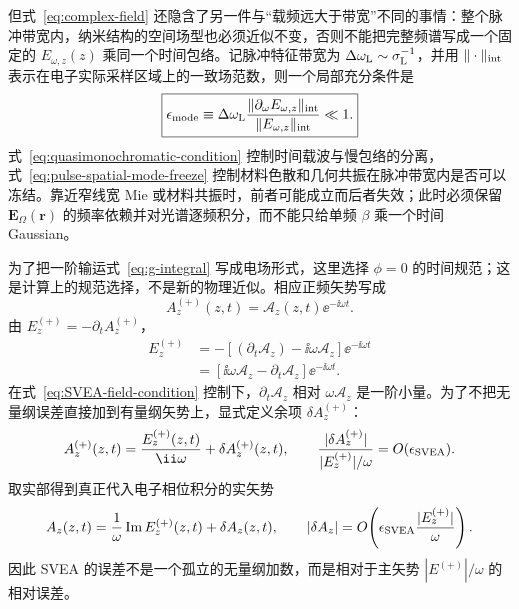 但式~\eqref{eq:complex-field} 还隐含了另一件与“载频远大于带宽”不同的事情：整个脉冲带宽内，纳米结构的空间场型也必须近似不变，否则不能把完整频谱写成一个固定的 $E_{\omega,z}(z)$ 乘同一个时间包络。记脉冲特征带宽为 $\Delta\omega_{\rm L}\sim\sigma_{\rm L}^{-1}$，并用 $\|\cdot\|_{\rm int}$ 表示在电子实际采样区域上的一致场范数，则一个局部充分条件是
\begin{equation}
\boxed{
\epsilon_{\rm mode}
\equiv
\Delta\omega_{\rm L}
\frac{\|\partial_\omega E_{\omega,z}\|_{\rm int}}
{\|E_{\omega,z}\|_{\rm int}}
\ll1.}
\label{eq:pulse-spatial-mode-freeze}
\end{equation}
式~\eqref{eq:quasimonochromatic-condition} 控制时间载波与慢包络的分离，式~\eqref{eq:pulse-spatial-mode-freeze} 控制材料色散和几何共振在脉冲带宽内是否可以冻结。靠近窄线宽 Mie 或材料共振时，前者可能成立而后者失效；此时必须保留 $\bm E_{\Omega}(\bm r)$ 的频率依赖并对光谱逐频积分，而不能只给单频 $\beta$ 乘一个时间 Gaussian。

为了把一阶输运式~\eqref{eq:g-integral} 写成电场形式，这里选择 $\phi=0$ 的时间规范；这是计算上的规范选择，不是新的物理近似。相应正频矢势写成
\begin{equation}
 A_z^{(+)}(z,t)
 =\mathcal A_z(z,t)\ee^{-\ii\omega t}.
\end{equation}
由 $E_z^{(+)}=-\partial_tA_z^{(+)}$，
\begin{align}
E_z^{(+)}
&=-\left[(\partial_t\mathcal A_z)-\ii\omega\mathcal A_z\right]
 \ee^{-\ii\omega t}\\
&=\left[\ii\omega\mathcal A_z-\partial_t\mathcal A_z\right]
 \ee^{-\ii\omega t}.
\end{align}
在式~\eqref{eq:SVEA-field-condition} 控制下，$\partial_t\mathcal A_z$ 相对 $\omega\mathcal A_z$ 是一阶小量。为了不把无量纲误差直接加到有量纲矢势上，显式定义余项 $\delta A_z^{(+)}$：
\begin{equation}
 A_z^{(+)}(z,t)
 =\frac{E_z^{(+)}(z,t)}{\ii\omega}
 +\delta A_z^{(+)}(z,t),
 \qquad
 \frac{|\delta A_z^{(+)}|}{|E_z^{(+)}|/\omega}
 =O(\epsilon_{\rm SVEA}).
 \label{eq:A-from-E-positive-frequency}
\end{equation}
取实部得到真正代入电子相位积分的实矢势
\begin{equation}
 A_z(z,t)
 =\frac{1}{\omega}\operatorname{Im}E_z^{(+)}(z,t)
 +\delta A_z(z,t),
 \qquad
 |\delta A_z|=O\!\left(\epsilon_{\rm SVEA}\frac{|E_z^{(+)}|}{\omega}\right).
 \label{eq:A-from-E}
\end{equation}
因此 SVEA 的误差不是一个孤立的无量纲加数，而是相对于主矢势 $|E^{(+)}|/\omega$ 的相对误差。

